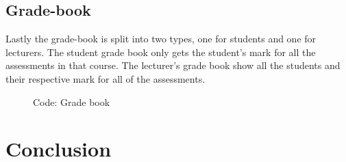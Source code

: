 \documentclass[a4paper,12pt]{article}
\numberwithin{equation}{section} %
\numberwithin{figure}{section}
\begin{document}
\subsection{Grade-book}
Lastly the grade-book is split into two types, one for students and one for lecturers. The student grade book only gets the student's mark for all the assessments in that course. The lecturer's grade book show all the students and their respective mark for all of the assessments. 

\begin{figure}[H]
\centering
{}
\caption{Code: Grade book}
\label{cGrade}
\end{figure}




%

\section{Conclusion}
\end{document}

